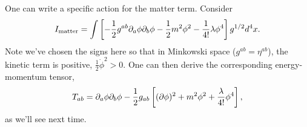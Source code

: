 \begin{exm}
    One can write a specific action for the matter term. Consider
    $$I_\text{matter}=\int \left[-\frac{1}{2} g^{ab}\partial_a \phi \partial_b \phi-\frac{1}{2} m^2 \phi^2 -\frac{1}{4!} \lambda \phi^4 \right] g^{1/2} d^4x.$$
    Note we've chosen the signs here so that in Minkowski space ($g^{ab}=\eta^{ab}$), the kinetic term is positive, $\frac{1}{2} \dot \phi^2 >0.$ One can then derive the corresponding energy-momentum tensor,
    $$T_{ab}=\partial_a \phi \partial_b \phi -\frac{1}{2} g_{ab} \left[(\partial\phi)^2+m^2\phi^2+\frac{\lambda}{4!}\phi^4\right],$$
    as we'll see next time.
\end{exm}